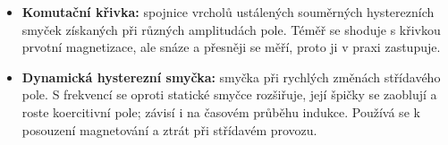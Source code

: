 \begin{itemize}
\item \textbf{Komutační křivka:} spojnice vrcholů ustálených souměrných hysterezních smyček získaných při různých amplitudách pole. Téměř se shoduje s křivkou prvotní magnetizace, ale snáze a přesněji se měří, proto ji v praxi zastupuje.
\item \textbf{Dynamická hysterezní smyčka:} smyčka při rychlých změnách střídavého pole. S frekvencí se oproti statické smyčce rozšiřuje, její špičky se zaoblují a roste koercitivní pole; závisí i na časovém průběhu indukce. Používá se k posouzení magnetování a ztrát při střídavém provozu.
\end{itemize}
